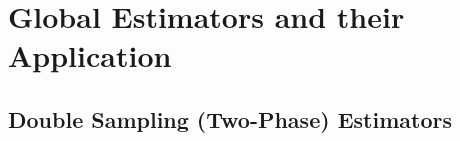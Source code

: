 \documentclass[article]{jss}
\begin{document}


\section[Global Estimators and their Application in R]{Global Estimators and their Application}
\label{sec:globest_and_appl}


\subsection{Double Sampling (Two-Phase) Estimators}

% 
% 
% 
% 
% 
% 
\end{document}
